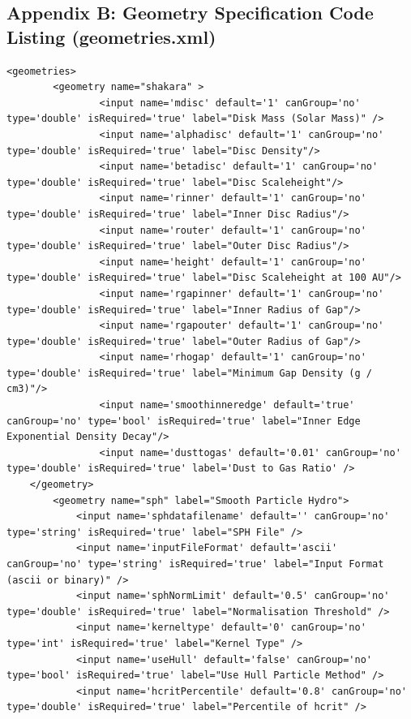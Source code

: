 \documentclass[a4paper,10pt]{article}
\begin{document}
\subsection{Appendix B: Geometry Specification Code Listing (geometries.xml)}
\begin{lstlisting}
<geometries>
        <geometry name="shakara" >
                <input name='mdisc' default='1' canGroup='no' type='double' isRequired='true' label="Disk Mass (Solar Mass)" />
                <input name='alphadisc' default='1' canGroup='no' type='double' isRequired='true' label="Disc Density"/>
                <input name='betadisc' default='1' canGroup='no' type='double' isRequired='true' label="Disc Scaleheight"/>
                <input name='rinner' default='1' canGroup='no' type='double' isRequired='true' label="Inner Disc Radius"/>
                <input name='router' default='1' canGroup='no' type='double' isRequired='true' label="Outer Disc Radius"/>
                <input name='height' default='1' canGroup='no' type='double' isRequired='true' label="Disc Scaleheight at 100 AU"/>
                <input name='rgapinner' default='1' canGroup='no' type='double' isRequired='true' label="Inner Radius of Gap"/>
                <input name='rgapouter' default='1' canGroup='no' type='double' isRequired='true' label="Outer Radius of Gap"/>
                <input name='rhogap' default='1' canGroup='no' type='double' isRequired='true' label="Minimum Gap Density (g / cm3)"/>
                <input name='smoothinneredge' default='true' canGroup='no' type='bool' isRequired='true' label="Inner Edge Exponential Density Decay"/>
                <input name='dusttogas' default='0.01' canGroup='no' type='double' isRequired='true' label='Dust to Gas Ratio' />
	</geometry>
        <geometry name="sph" label="Smooth Particle Hydro">
            <input name='sphdatafilename' default='' canGroup='no' type='string' isRequired='true' label="SPH File" />
            <input name='inputFileFormat' default='ascii' canGroup='no' type='string' isRequired='true' label="Input Format (ascii or binary)" />
            <input name='sphNormLimit' default='0.5' canGroup='no' type='double' isRequired='true' label="Normalisation Threshold" />
            <input name='kerneltype' default='0' canGroup='no' type='int' isRequired='true' label="Kernel Type" />
            <input name='useHull' default='false' canGroup='no' type='bool' isRequired='true' label="Use Hull Particle Method" />
            <input name='hcritPercentile' default='0.8' canGroup='no' type='double' isRequired='true' label="Percentile of hcrit" />

\end{lstlisting}
\end{document}
